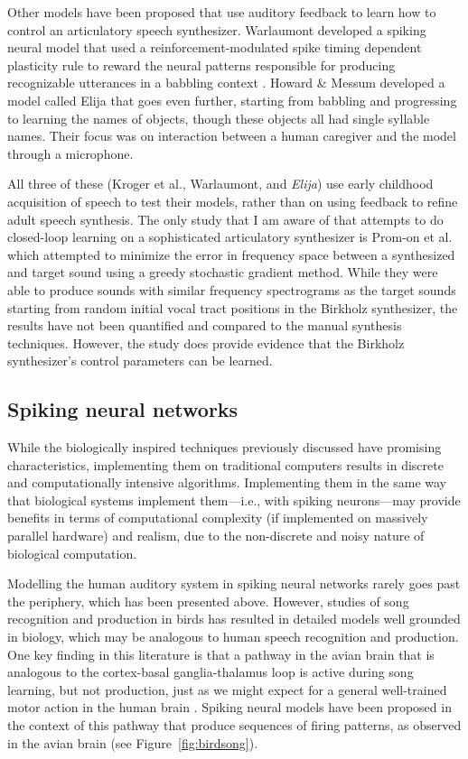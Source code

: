 \documentclass{article}
\begin{document}
Other models have been proposed
that use auditory feedback
to learn how to control
an articulatory speech synthesizer.
Warlaumont developed a spiking neural model
that used a reinforcement-modulated
spike timing dependent plasticity rule
to reward the neural patterns
responsible for producing
recognizable utterances
in a babbling context
\citep{warlaumont2012,warlaumont2013}.
Howard \& Messum developed
a model called Elija
that goes even further,
starting from babbling
and progressing to learning
the names of objects,
though these objects all had
single syllable names.
Their focus was on interaction
between a human caregiver
and the model through a microphone.

All three of these
(Kroger et al., Warlaumont, and \textit{Elija})
use early childhood acquisition of speech
to test their models,
rather than on using feedback
to refine adult speech synthesis.
The only study that I am aware of
that attempts to do closed-loop learning
on a sophisticated articulatory synthesizer
is Prom-on et al. which attempted
to minimize the error in frequency space
between a synthesized and target sound
using a greedy stochastic gradient method.
While they were able to produce
sounds with similar frequency spectrograms
as the target sounds starting from
random initial vocal tract positions
in the Birkholz synthesizer,
the results have not been quantified
and compared to the manual
synthesis techniques.
However, the study does provide
evidence that the Birkholz synthesizer's
control parameters can be learned.

\subsection{Spiking neural networks}

While the biologically inspired techniques
previously discussed have
promising characteristics,
implementing them on traditional computers
results in discrete and
computationally intensive algorithms.
Implementing them in the same way
that biological systems implement
them---i.e., with spiking neurons---may
provide benefits in terms of
computational complexity
(if implemented on massively parallel hardware)
and realism, due to the non-discrete
and noisy nature of biological computation.

Modelling the human auditory system
in spiking neural networks
rarely goes past the periphery,
which has been presented above.
However, studies of
song recognition and production
in birds has resulted in
detailed models well grounded
in biology, which may be analogous
to human speech recognition and production.
One key finding in this literature
is that a pathway in the avian brain
that is analogous to
the cortex-basal ganglia-thalamus loop
is active during song learning,
but not production,
just as we might expect
for a general well-trained motor action
in the human brain
\citep{fiete2008}.
Spiking neural models have been proposed
in the context of this pathway
that produce sequences of firing patterns,
as observed in the avian brain (see Figure~\ref{fig:birdsong}).
\end{document}
